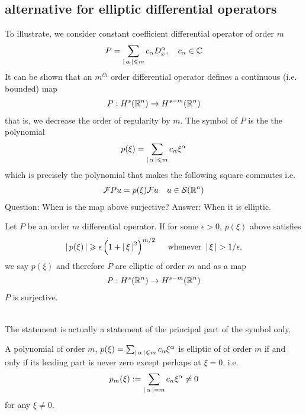 \documentclass{article}
\begin{document}
\subsection{alternative for elliptic differential operators} 
To illustrate, we consider constant coefficient differential operator of order $m$
\begin{align*}
P = \sum_{\left|\, \alpha\,\right| \leqslant m} c_\alpha D^\alpha_x, \quad c_\alpha \in {\ensuremath {\mathbb C}}
\end{align*}
It can be shown that an $m^{th}$ order differential operator defines a continuous (i.e. bounded) map 
\begin{align*}
P : H^{s}({\mathbb R}^n) \to H^{s - m}({\mathbb R}^n)
\end{align*}
that is, we decrease the order of regularity by $m$. The symbol of $P$ is the the polynomial 
\begin{align*}
p(\xi) = \sum_{\left|\, \alpha\,\right| \leqslant m} c_\alpha \xi^\alpha 
\end{align*}
which is precisely the polynomial that makes the following square commutes
i.e. 
\begin{align*}
{\ensuremath {\cal F}} Pu  = p(\xi) {\cal F} u  \quad u \in \mathcal{S}({\mathbb R}^n) 
\end{align*}
Question: When is the map above surjective? Answer: When it is elliptic. 

\begin{theorem}
    Let $P$ be an order $m$ differential operator. If for some $\epsilon > 0$, $p(\xi)$ above satisfies
    \begin{align*}
    \left|\, p(\xi)\,\right| \geqslant \epsilon \left( 1 + \left|\, \xi\,\right|^2\right)^{m / 2} \quad \text{ whenever } \left|\, \xi\,\right| > 1/\epsilon, 
    \end{align*}
    we say $p(\xi)$ and therefore $P$ are elliptic of order $m$ and as a map
    \begin{align*}
    P: H^{s}({\mathbb R}^n) \to H^{s - m}({\mathbb R}^n)
    \end{align*}
    $P$ is surjective. 
\end{theorem}
 \\

The statement is actually a statement of the principal part of the symbol only. 
\begin{lemma}
    A polynomial of order $m$, $p(\xi) = \sum_{\left|\, \alpha\,\right| \leqslant m} c_\alpha \xi^\alpha$ is elliptic of of order $m$ if and only if its leading part is never zero except perhaps at $\xi = 0$, i.e. 
    \begin{align*}
    p_m(\xi) := \sum_{\left|\, \alpha\,\right| = m} c_\alpha \xi^\alpha \neq 0 
    \end{align*}
    for any $\xi \neq 0$. 
\end{lemma}
\end{document}
